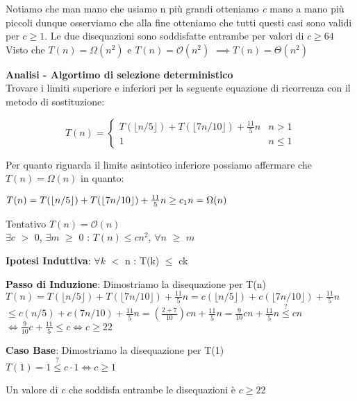 \documentclass[../cheatSheetAlgoritmi.tex]{subfiles}
\begin{document}
Notiamo che man mano che usiamo n più grandi otteniamo \textit{c} mano a mano più piccoli dunque osserviamo che alla fine otteniamo che tutti questi casi sono validi per $c \geq 1$.
Le due disequazioni sono soddisfatte entrambe per valori di $c \geq 64$\\
Visto che $T(n) = \Omega(n^{2})$ e $T(n) = \mathcal{O}(n^{2})$ $\implies T(n) = \Theta(n^{2})$

\bigskip
\textbf{Analisi - Algortimo di selezione deterministico}\\
Trovare i limiti superiore e inferiori per la seguente equazione di ricorrenza con il metodo di sostituzione:
\begin{center}
	\begin{equation*}
  		T(n)=\begin{cases}
			T(\lfloor n/5 \rfloor) + T(\lfloor 7n/10 \rfloor) + \frac{11}{5}n & \text{$n > 1$}\\
			1 & \text{$n \leq 1$}	
 		 \end{cases}
	\end{equation*}
\end{center}
Per quanto riguarda il limite asintotico inferiore possiamo affermare che $T(n) = \Omega(n)$ in quanto:

$T(n) = T(\lfloor n/5 \rfloor) + T(\lfloor 7n/10 \rfloor) + \frac{11}{5}n \geq c\textsubscript{1}n = \Omega(n)$

\bigskip
Tentativo $T(n) = \mathcal{O}(n)$\\
$\exists c$ $>$ 0, $\exists m$ $\geq$ 0 : $T(n) \leq cn^{2}$, $\forall n$ $\geq$ $m$

\bigskip
\textbf{Ipotesi Induttiva}: $\forall k$ $<$ n : T(k) $\leq$ ck

\textbf{Passo di Induzione}: Dimostriamo la disequazione per T(n)\\
$T(n) = T(\lfloor n/5 \rfloor) + T(\lfloor 7n/10 \rfloor) + \frac{11}{5}n = c(\lfloor n/5 \rfloor) + c(\lfloor 7n/10 \rfloor) + \frac{11}{5}n$\\
$\leq c(n/5) + c(7n/10) + \frac{11}{5}n = (\frac{2 + 7}{10})cn + \frac{11}{5}n = \frac{9}{10}cn + \frac{11}{5}n \stackrel{?}{\leq} cn$\\
$\iff \frac{9}{10}c + \frac{11}{5} \leq c \iff c \geq 22$

\bigskip
\textbf{Caso Base}: Dimostriamo la disequazione per T(1)\\
$T(1) = 1 \stackrel{?}{\leq} c \cdot 1 \iff c \geq 1$

\bigskip
Un valore di $c$ che soddisfa entrambe le disequazioni è $c \geq 22$
\end{document}
